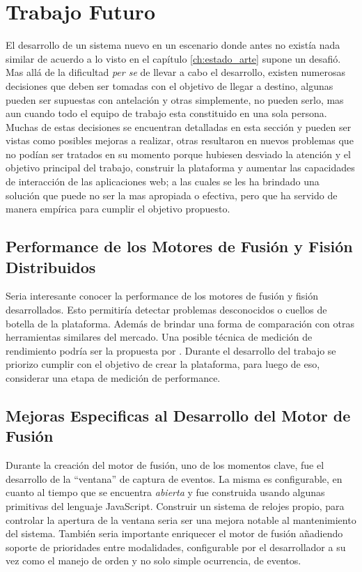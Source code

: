 \section{Trabajo Futuro} \label{sec:end_future}
El desarrollo de un sistema nuevo en un escenario donde antes no existía nada similar de acuerdo a lo visto en el capítulo \ref{ch:estado_arte} supone un desafió. Mas allá de la dificultad \emph{per se} de llevar a cabo el desarrollo, existen numerosas decisiones que deben ser tomadas con el objetivo de llegar a destino, algunas pueden ser supuestas con antelación y otras simplemente, no pueden serlo, mas aun cuando todo el equipo de trabajo esta constituido en una sola persona. Muchas de estas decisiones se encuentran detalladas en esta sección y pueden ser vistas como posibles mejoras a realizar, otras resultaron en nuevos problemas que no podían ser tratados en su momento porque hubiesen desviado la atención y el objetivo principal del trabajo, construir la plataforma y aumentar las capacidades de interacción de las aplicaciones web; a las cuales se les ha brindado una solución que puede no ser la mas apropiada o efectiva, pero que ha servido de manera empírica para cumplir el objetivo propuesto.

\subsection{Performance de los Motores de Fusión y Fisión Distribuidos}
Seria interesante conocer la performance de los motores de fusión y fisión desarrollados. Esto permitiría detectar problemas desconocidos o cuellos de botella de la plataforma. Además de brindar una forma de comparación con otras herramientas similares del mercado. Una posible técnica de medición de rendimiento podría ser la propuesta por \citet{dumas2009benchmarking}. Durante el desarrollo del trabajo se priorizo cumplir con el objetivo de crear la plataforma, para luego de eso, considerar una etapa de medición de performance.

\subsection{Mejoras Especificas al Desarrollo del Motor de Fusión}
Durante la creación del motor de fusión, uno de los momentos clave, fue el desarrollo de la ``ventana'' de captura de eventos. La misma es configurable, en cuanto al tiempo que se encuentra \textit{abierta} y fue construida usando algunas primitivas del lenguaje JavaScript. Construir un sistema de relojes propio, para controlar la apertura de la ventana seria ser una mejora notable al mantenimiento del sistema. También seria importante enriquecer el motor de fusión añadiendo soporte de prioridades entre modalidades, configurable por el desarrollador a su vez como el manejo de orden y no solo simple ocurrencia, de eventos.

